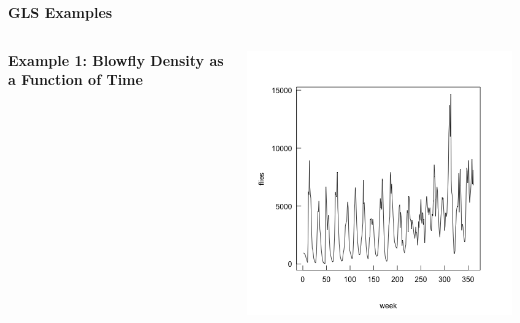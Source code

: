 \documentclass{beamer}
\begin{document}
\begin{frame}
  \begin{center}
    \huge\color{purple}\textbf{GLS Examples}
  \end{center}
\end{frame}

\begin{frame}[fragile]{}
\begin{columns}
    \begin{column}{0.4\textwidth}
        \huge\textbf{Example 1: Blowfly Density as a Function of Time}
    \end{column}
    \begin{column}{0.6\textwidth}
        \includegraphics[width=\textwidth]{lectures/day_4_GLS/figures/unnamed-chunk-16-1.png}
    \end{column}
\end{columns}
\end{frame}
\end{document}
